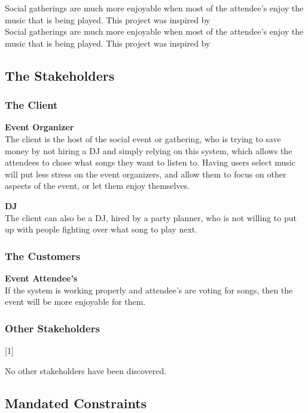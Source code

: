 \documentclass[12pt, titlepage]{article}
\begin{document}
Social gatherings are much more enjoyable when most of the attendee's enjoy
the music that is being played. This project was inspired by \\

Social gatherings are much more enjoyable when most of the attendee's enjoy
the music that is being played. This project was inspired by

\subsection{The Stakeholders}

\subsubsection{The Client}

\textbf{Event Organizer}\\
The client is the host of the social event or gathering, who is trying to save
money by not hiring a DJ and simply relying on this system, which allows the
attendees to chose what songs they want to listen to. Having users select music
will put less stress on the event organizers, and allow them to focus on other
aspects of the event, or let them enjoy themselves.

\textbf{DJ}\\
The client can also be a DJ, hired by a party planner, who is not willing to put
up with people fighting over what song to play next.

\subsubsection{The Customers}

\textbf{Event Attendee's}\\
If the system is working properly and attendee's are voting for songs, then
the event will be more enjoyable for them.
\subsubsection{Other Stakeholders}[1]

No other stakeholders have been discovered.

\subsection{Mandated Constraints}
\end{document}
